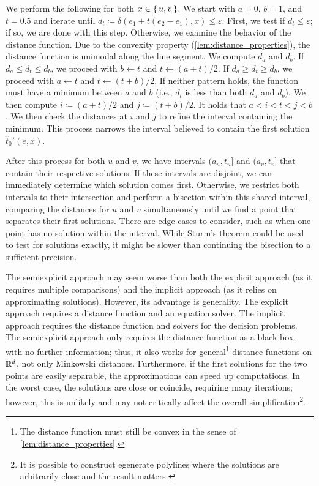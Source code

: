 We perform the following for both \(x \in \set{u, v}\). We start with \(a = 0\), \(b = 1\), and \(t = 0.5\) and iterate until \(d_t \coloneq \delta(e_1 + t(e_2 - e_1), x) \leq \varepsilon\).
First, we test if \(d_t \leq \varepsilon\); if so, we are done with this step. Otherwise, we examine the behavior of the distance function. Due to the convexity property (\cref{lem:distance_properties}), the distance function is unimodal along the line segment. We compute \(d_a\) and \(d_b\). If \(d_a \leq d_t \leq d_b\), we proceed with \(b \gets t\) and \(t \gets (a + t)/2\). If \(d_a \geq d_t \geq d_b\), we proceed with \(a \gets t\) and \(t \gets (t + b)/2\). If neither pattern holds, the function must have a minimum between \(a\) and \(b\) (i.e., \(d_t\) is less than both \(d_a\) and \(d_b\)). We then compute \(i \coloneq (a + t)/2\) and \(j \coloneq (t + b)/2\). It holds that \(a < i < t < j < b\). We then check the distances at \(i\) and \(j\) to refine the interval containing the minimum. This process narrows the interval believed to contain the first solution \(\hat t_0'(e, x)\).

After this process for both \(u\) and \(v\), we have intervals \((a_u, t_u]\) and \((a_v, t_v]\) that contain their respective solutions. If these intervals are disjoint, we can immediately determine which solution comes first. Otherwise, we restrict both intervals to their intersection and perform a bisection within this shared interval, comparing the distances for \(u\) and \(v\) simultaneously until we find a point that separates their first solutions. There are edge cases to consider, such as when one point has no solution within the interval. While Sturm's theorem could be used to test for solutions exactly, it might be slower than continuing the bisection to a sufficient precision.

The semiexplicit approach may seem worse than both the explicit approach (as it requires multiple comparisons) and the implicit approach (as it relies on approximating solutions). However, its advantage is generality. The explicit approach requires a distance function and an equation solver. The implicit approach requires the distance function and solvers for the decision problems. The semiexplicit approach only requires the distance function as a black box, with no further information; thus, it also works for general\footnote{The distance function must still be convex in the sense of \cref{lem:distance_properties}.} distance functions on \(\mathbb{R}^d\), not only Minkowski distances. Furthermore, if the first solutions for the two points are easily separable, the approximations can speed up computations. In the worst case, the solutions are close or coincide, requiring many iterations; however, this is unlikely and may not critically affect the overall simplification\footnote{It is possible to construct egenerate polylines where the solutions are arbitrarily close and the result matters.}.

